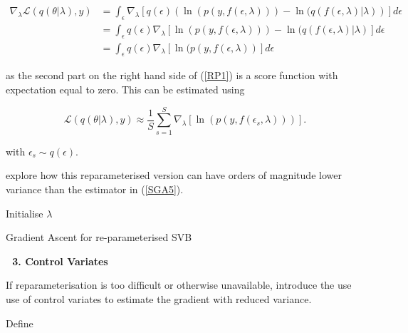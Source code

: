 \documentclass{article}\usepackage[]{graphicx}\usepackage[]{color}
\numberwithin{equation}{section}
\begin{document}
\begin{align}
\nabla_{\lambda} \mathcal{L}(q(\theta | \lambda), y) &=  \int_{\epsilon} \nabla_{\lambda}[  q(\epsilon) \left( \ln (p(y, f(\epsilon, \lambda))) - \ln(q(f(\epsilon, \lambda) | \lambda) \right)] d\epsilon \nonumber \\
&=  \int_{\epsilon}  q(\epsilon) \nabla_{\lambda} \left[ \ln (p(y, f(\epsilon, \lambda))) - \ln(q(f(\epsilon, \lambda)| \lambda) \right] d\epsilon \label{RP1} \\
&= \int_{\epsilon}  q(\epsilon) \nabla_{\lambda} \left[ \ln (p(y, f(\epsilon, \lambda)) \right] d\epsilon\nonumber
\end{align}

as the second part on the right hand side of (\ref{RP1}) is a score function with expectation equal to zero. This can be estimated using 

\begin{equation}
\label{RP2}
 \mathcal{L}(q(\theta | \lambda), y) \approx  \frac{1}{S}\sum_{s=1}^{S} \nabla_{\lambda} \left[ \ln (p(y, f(\epsilon_s, \lambda))) \right].
\end{equation}

with $\epsilon_s \sim q(\epsilon)$.

\citet{Kingma2015} explore how this reparameterised version can have orders of magnitude lower variance than the estimator in (\ref{SGA5}).


\begin{algorithm}[H]
 Initialise $\lambda$\;
 \caption{Gradient Ascent for re-parameterised SVB}
  \label{alg:algorithm3}
\end{algorithm}


$\mbox{ }$\newline \textbf{3. Control Variates} \newline

If reparameterisation is too difficult or otherwise unavailable, \citet{Paisly2012} introduce the use use of control variates to estimate the gradient with reduced variance.

Define
\end{document}
